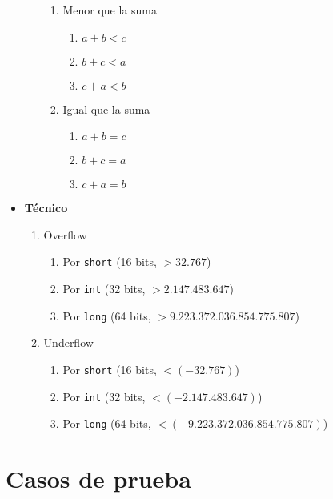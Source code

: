 \begin{itemize}
\begin{enumerate}[label=L\arabic*.]
\begin{enumerate}[label=L2.\arabic*.]
					\item Menor que la suma
						\begin{enumerate}[label=L2.1.\arabic*.]
							\item $a + b < c$
							\item $b + c < a$
							\item $c + a < b$
						\end{enumerate}
					\item Igual que la suma
						\begin{enumerate}[label=L2.2.\arabic*.]
							\item $a + b = c$
							\item $b + c = a$
							\item $c + a = b$
						\end{enumerate}
				\end{enumerate}
		\end{enumerate}
	\item \textbf{Técnico}
		\begin{enumerate}[label=T\arabic*.]
			\item Overflow
				\begin{enumerate}[label=T1.\arabic*.]
					\item Por \Verb#short# (16 bits, $>32.767$)
					\item Por \Verb#int# (32 bits, $>2.147.483.647$)
					\item Por \Verb#long# (64 bits, $>9.223.372.036.854.775.807$)
				\end{enumerate}
			\item Underflow
				\begin{enumerate}[label=T2.\arabic*.]
					\item Por \Verb#short# (16 bits, $<(-32.767)$)
					\item Por \Verb#int# (32 bits, $<(-2.147.483.647)$)
					\item Por \Verb#long# (64 bits, $<(-9.223.372.036.854.775.807)$)
				\end{enumerate}
		\end{enumerate}
\end{itemize}
\newpage{}
\section{Casos de prueba}
